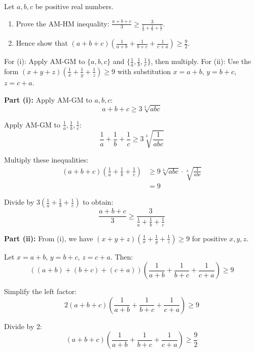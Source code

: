 \begin{problem}
Let $a, b, c$ be positive real numbers.
\begin{enumerate}
    \item[(i)] Prove the AM-HM inequality: $\frac{a+b+c}{3} \ge \frac{3}{\frac{1}{a} + \frac{1}{b} + \frac{1}{c}}$.
    \item[(ii)] Hence show that $(a+b+c)\left(\frac{1}{a+b} + \frac{1}{b+c} + \frac{1}{c+a}\right) \ge \frac{9}{2}$.
\end{enumerate}
\end{problem}

\begin{hint}
For (i): Apply AM-GM to $\{a,b,c\}$ and $\{\frac{1}{a},\frac{1}{b},\frac{1}{c}\}$, then multiply. For (ii): Use the form $(x+y+z)\left(\frac{1}{x}+\frac{1}{y}+\frac{1}{z}\right) \ge 9$ with substitution $x=a+b$, $y=b+c$, $z=c+a$.
\end{hint}

\begin{solution}
\textbf{Part (i):} Apply AM-GM to $a, b, c$:
\[ a+b+c \ge 3\sqrt[3]{abc} \]

Apply AM-GM to $\frac{1}{a}, \frac{1}{b}, \frac{1}{c}$:
\[ \frac{1}{a} + \frac{1}{b} + \frac{1}{c} \ge 3\sqrt[3]{\frac{1}{abc}} \]

Multiply these inequalities:
\begin{align*}
(a+b+c)\left(\frac{1}{a} + \frac{1}{b} + \frac{1}{c}\right) &\ge 9\sqrt[3]{abc} \cdot \sqrt[3]{\frac{1}{abc}} \\
&= 9
\end{align*}

Divide by $3\left(\frac{1}{a} + \frac{1}{b} + \frac{1}{c}\right)$ to obtain:
\[ \frac{a+b+c}{3} \ge \frac{3}{\frac{1}{a} + \frac{1}{b} + \frac{1}{c}} \]

\textbf{Part (ii):} From (i), we have $(x+y+z)\left(\frac{1}{x} + \frac{1}{y} + \frac{1}{z}\right) \ge 9$ for positive $x, y, z$.

Let $x = a+b$, $y = b+c$, $z = c+a$. Then:
\[ ((a+b) + (b+c) + (c+a)) \left( \frac{1}{a+b} + \frac{1}{b+c} + \frac{1}{c+a} \right) \ge 9 \]

Simplify the left factor:
\[ 2(a+b+c) \left( \frac{1}{a+b} + \frac{1}{b+c} + \frac{1}{c+a} \right) \ge 9 \]

Divide by 2:
\[ (a+b+c) \left( \frac{1}{a+b} + \frac{1}{b+c} + \frac{1}{c+a} \right) \ge \frac{9}{2} \]
\end{solution}

